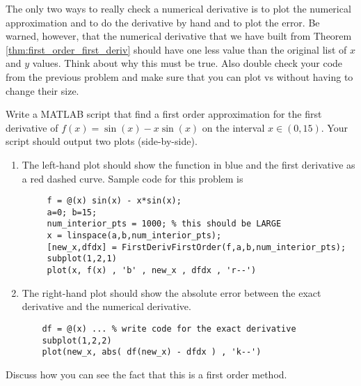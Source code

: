 The only two ways to really check a numerical derivative is to plot the numerical
approximation and to do the derivative by hand and to plot the error. Be warned, however,
that the numerical derivative that we have built from Theorem
\ref{thm:first_order_first_deriv} should have one less value than the
original list of $x$ and $y$ values.  Think about why this must be true. Also double check
your code from the previous problem and make sure that you can plot  vs
 without having to change their size.  

\begin{problem}
    Write a MATLAB script that find a first order approximation for the first derivative
    of $f(x) = \sin(x) - x\sin(x)$ on the interval $x \in (0,15)$.  Your script should
    output two plots (side-by-side). 
    \begin{enumerate}
        \item The left-hand plot should show the function in blue and the first derivative
            as a red dashed curve. Sample code for this problem is
    \begin{lstlisting}
     f = @(x) sin(x) - x*sin(x);
     a=0; b=15;
     num_interior_pts = 1000; % this should be LARGE
     x = linspace(a,b,num_interior_pts);
     [new_x,dfdx] = FirstDerivFirstOrder(f,a,b,num_interior_pts);
     subplot(1,2,1)
     plot(x, f(x) , 'b' , new_x , dfdx , 'r--')
    \end{lstlisting}
        \item The right-hand plot should show the absolute error between the exact derivative and
            the numerical derivative.
    \begin{lstlisting}
    df = @(x) ... % write code for the exact derivative
    subplot(1,2,2)
    plot(new_x, abs( df(new_x) - dfdx ) , 'k--')
    \end{lstlisting}
    \end{enumerate}
    Discuss how you can see the fact that this is a first order method.
\end{problem}


% 

